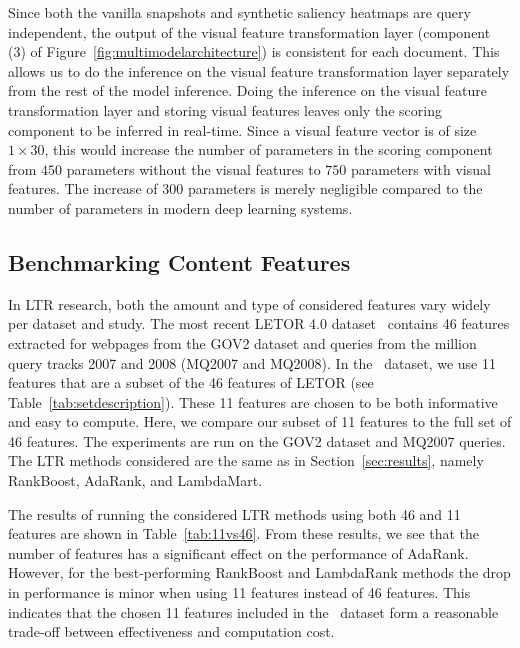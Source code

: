 Since both the vanilla snapshots and synthetic saliency heat\-maps are query independent, the output of the visual feature transformation layer (component (3) of Figure~\ref{fig:multimodelarchitecture}) is consistent for each document.
This allows us to do the inference on the visual feature transformation layer separately from the rest of the model inference.
Doing the inference on the visual feature transformation layer and storing visual features leaves only the scoring component to be inferred in real-time.
Since a visual feature vector is of size $1\times30$, this would increase the number of parameters in the scoring component from $450$ parameters without the visual features to $750$ parameters with visual features.
The increase of $300$ parameters is merely negligible compared to the number of parameters in modern deep learning systems.


\subsection{Benchmarking Content Features} \label{sec:contentfeatures}
In \ac{LTR} research, both the amount and type of considered features vary widely per dataset and study.
The most recent LETOR 4.0 dataset~\cite{Qin2013:Introducing} contains 46 features extracted for webpages from the GOV2 dataset and queries from the million query tracks 2007 and 2008 (MQ2007 and MQ2008).
In the \datasetname~dataset, we use 11 features that are a subset of the 46 features of LETOR (see Table~\ref{tab:setdescription}).
These 11 features are chosen to be both informative and easy to compute.
Here, we compare our subset of 11 features to the full set of 46 features.
The experiments are run on the GOV2 dataset and MQ2007 queries.
The \ac{LTR} methods considered are the same as in Section~\ref{sec:results}, namely RankBoost, AdaRank, and LambdaMart.

The results of running the considered \ac{LTR} methods using both 46 and 11 features are shown in Table~\ref{tab:11vs46}.
From these results, we see that the number of features has a significant effect on the performance of AdaRank.
However, for the best-performing RankBoost and LambdaRank methods the drop in performance is minor when using 11 features instead of 46 features.
This indicates that the chosen 11 features included in the \datasetname~dataset form a reasonable trade-off between effectiveness and computation cost.

